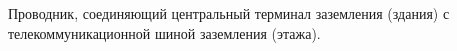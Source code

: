 Проводник, соединяющий центральный терминал заземления
(здания) с телекоммуникационной шиной заземления (этажа).